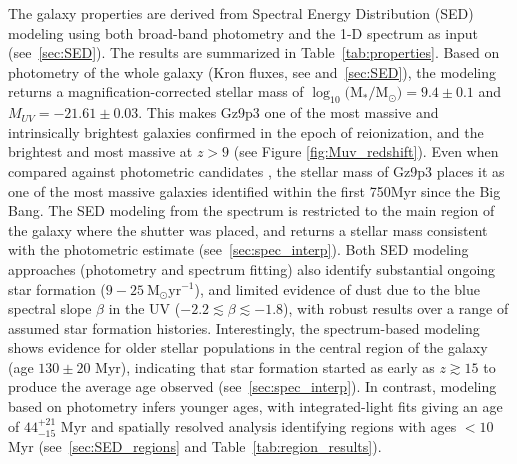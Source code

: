\documentclass[sn-mathphys]{sn-jnl}%
\theoremstyle{thmstyleone}%
\theoremstyle{thmstyletwo}%
\theoremstyle{thmstylethree}%
\begin{document}
The galaxy properties are derived from Spectral Energy Distribution (SED) modeling using both broad-band photometry and the 1-D spectrum as input (see~\ref{sec:SED}). The results are summarized in Table~\ref{tab:properties}. Based on photometry of the whole galaxy (Kron fluxes, see \cite{Paris23} and~\ref{sec:SED}), the modeling returns a magnification-corrected stellar mass of $\log_{10}($M$_*/$M$_\odot)=9.4\pm0.1$ and $M_{UV}=-21.61\pm0.03$. This makes Gz9p3 one of the most massive and intrinsically brightest galaxies confirmed in the epoch of reionization, and the brightest and most massive at $z>9$ (see Figure \ref{fig:Muv_redshift}). Even when compared against photometric candidates \cite{Labbe22}, the stellar mass of Gz9p3 places it as one of the most massive galaxies identified within the first 750Myr since the Big Bang. The SED modeling from the spectrum is restricted to the main region of the galaxy where the shutter was placed, and returns a stellar mass consistent with the photometric estimate (see~\ref{sec:spec_interp}). Both SED modeling approaches (photometry and spectrum fitting) also identify substantial ongoing star formation ($9-25~\mathrm{M_{\odot}yr^{-1}}$), and limited evidence of dust due to the blue spectral slope $\beta$ in the UV ($-2.2 \lesssim \beta \lesssim -1.8$), with robust results over a range of assumed star formation histories. Interestingly, the spectrum-based modeling shows evidence for older stellar populations in the central region of the galaxy (age $130\pm 20$ Myr), indicating that star formation started as early as $z\gtrsim 15$ to produce the average age observed (see~\ref{sec:spec_interp}). In contrast, modeling based on photometry infers younger ages, with integrated-light fits giving an age of $44^{+21}_{-15}$ Myr and spatially resolved analysis identifying regions with ages $<10$ Myr (see~\ref{sec:SED_regions} and Table~\ref{tab:region_results}).  
\end{document}
